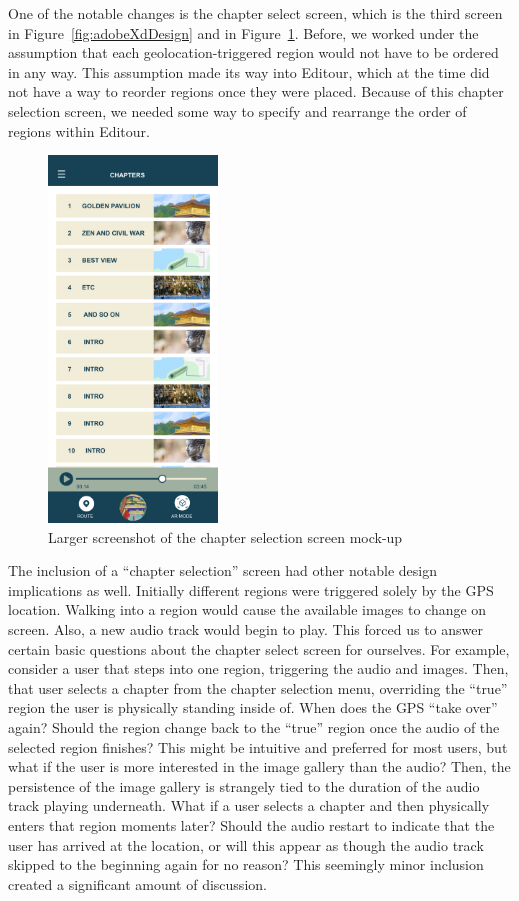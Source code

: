 \documentclass[a4paper, 10pt, american, titlepage]{article}
\begin{document}
One of the notable changes is the chapter select screen, which is the third
screen in Figure~\ref{fig:adobeXdDesign} and in Figure~\ref{fig:chaptersZoomed}.
Before, we worked under the assumption that each geolocation-triggered region
would not have to be ordered in any way. This assumption made its way into
Editour, which at the time did not have a way to reorder regions once they were
placed. Because of this chapter selection screen, we needed some way to specify
and rearrange the order of regions within Editour.

\begin{figure}[h] \centering
    \includegraphics[width=0.4\textwidth]{chapters-zoomed.png}
    \caption{Larger screenshot of the chapter selection screen mock-up}
    \label{fig:chaptersZoomed}
\end{figure}

The inclusion of a ``chapter selection'' screen had other notable design
implications as well. Initially different regions were triggered solely by the
GPS location. Walking into a region would cause the available images to change
on screen. Also, a new audio track would begin to play. This forced us to answer
certain basic questions about the chapter select screen for ourselves. For
example, consider a user that steps into one region, triggering the audio and
images. Then, that user selects a chapter from the chapter selection menu,
overriding the ``true'' region the user is physically standing inside of. When
does the GPS ``take over'' again? Should the region change back to the ``true''
region once the audio of the selected region finishes? This might be intuitive
and preferred for most users, but what if the user is more interested in the
image gallery than the audio? Then, the persistence of the image gallery is
strangely tied to the duration of the audio track playing underneath. What if a
user selects a chapter and then physically enters that region moments later?
Should the audio restart to indicate that the user has arrived at the location,
or will this appear as though the audio track skipped to the beginning again for
no reason? This seemingly minor inclusion created a significant amount of
discussion.
\end{document}
